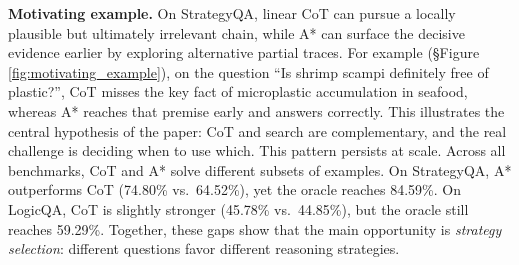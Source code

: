 \documentclass[10pt]{article}
\begin{document}

\textbf{Motivating example.} On StrategyQA, linear CoT can pursue a locally plausible but ultimately irrelevant chain, while A* can surface the decisive evidence earlier by exploring alternative partial traces. For example (\S Figure \ref{fig:motivating_example}), on the question ``Is shrimp scampi definitely free of plastic?'', CoT misses the key fact of microplastic accumulation in seafood, whereas A* reaches that premise early and answers correctly. This illustrates the central hypothesis of the paper: CoT and search are complementary, and the real challenge is deciding when to use which. This pattern persists at scale. Across all benchmarks, CoT and A* solve different subsets of examples. On StrategyQA, A* outperforms CoT (74.80\% vs.\ 64.52\%), yet the oracle reaches 84.59\%. On LogicQA, CoT is slightly stronger (45.78\% vs.\ 44.85\%), but the oracle still reaches 59.29\%. Together, these gaps show that the main opportunity is \emph{strategy selection}: different questions favor different reasoning strategies.


\end{document}
